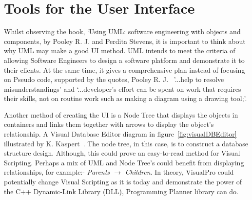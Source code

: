 \documentclass[12pt]{report} %
\begin{document}
	\section{Tools for the User Interface}  
		Whilst observing the book, `Using UML: software engineering with objects and components, by Pooley R. J. and Perdita Stevens\cite{pooley_r_j_using_2006}, it is important to think about why UML may make a good UI method. UML intends to meet the criteria of allowing Software Engineers to design a software platform and demonstrate it to their clients. At the same time, it gives a comprehensive plan instead of focusing on Pseudo code, supported by the quotes, Pooley R. J.~\cite{pooley_r_j_using_2006} '...help to resolve misunderstandings' and `...developer's effort can be spent on work that requires their skills, not on routine work such as making a diagram using a drawing tool;'.
		
		Another method of creating the UI is a Node Tree that displays the objects in containers and links them together with arrows to display the object's relationship. A Visual Database Editor diagram in figure~\ref{fig:visualDBEditor} illustrated by K. K${\ddot{u}}$spert~\cite{kuspert_design_1990}. The node tree, in this case, is to construct a database structure design. Although, this could prove an easy-to-read method for Visual Scripting. Perhaps a mix of UML and Node Tree's could benefit from displaying relationships, for example:- \textit{Parents ${\to}$ Children}. In theory, VisualPro could potentially change Visual Scripting as it is today and demonstrate the power of the C++ Dynamic-Link Library (DLL), Programming Planner library can do.
\end{document}
